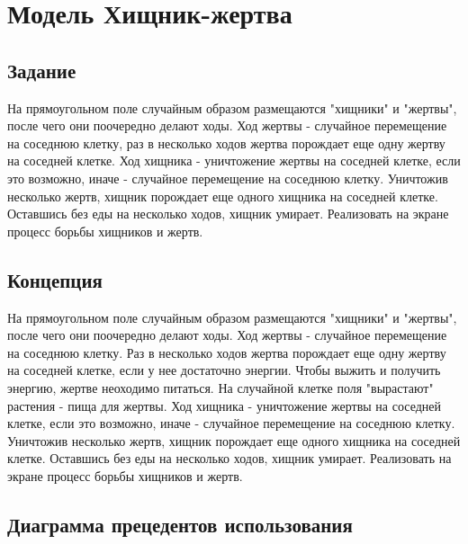 \documentclass[a4paper]{article}
\begin{document}
\vfill %
\tableofcontents
\newpage

\section{Модель Хищник-жертва}
\subsection{Задание}
На прямоугольном поле случайным образом размещаются "хищники" и "жертвы", после чего они поочередно делают ходы. Ход жертвы - случайное перемещение на соседнюю клетку, раз в несколько ходов жертва порождает еще одну жертву на соседней клетке. Ход хищника - уничтожение жертвы на соседней клетке, если это возможно, иначе - случайное перемещение на соседнюю клетку. Уничтожив несколько жертв, хищник порождает еще одного хищника на соседней клетке. Оставшись без еды на несколько ходов, хищник умирает. Реализовать на экране процесс борьбы хищников и жертв. 

\subsection{Концепция}
На прямоугольном поле случайным образом размещаются "хищники" и "жертвы", после чего они поочередно делают ходы. Ход жертвы - случайное перемещение на соседнюю клетку. Раз в несколько ходов жертва порождает еще одну жертву на соседней клетке, если у нее достаточно энергии. Чтобы выжить и получить энергию, жертве неоходимо питаться. На случайной клетке поля "вырастают" растения - пища для жертвы. Ход хищника - уничтожение жертвы на соседней клетке, если это возможно, иначе - случайное перемещение на соседнюю клетку. Уничтожив несколько жертв, хищник порождает еще одного хищника на соседней клетке. Оставшись без еды на несколько ходов, хищник умирает. Реализовать на экране процесс борьбы хищников и жертв. 


\subsection{Диаграмма прецедентов использования}
\end{document}
